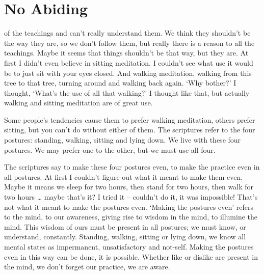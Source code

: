 
\chapter{No Abiding}

\vspace*{0.5\baselineskip}
 of the teachings and can't really understand them. We think they shouldn't be the way they are, so we don't follow them, but really there is a reason to all the teachings. Maybe it seems that things shouldn't be that way, but they are. At first I didn't even believe in sitting meditation. I couldn't see what use it would be to just sit with your eyes closed. And walking meditation, walking from this tree to that tree, turning around and walking back again. `Why bother?' I thought, `What's the use of all that walking?' I thought like that, but actually walking and sitting meditation are of great use. 

Some people's tendencies cause them to prefer walking meditation, others prefer sitting, but you can't do without either of them. The scriptures refer to the four postures: standing, walking, sitting and lying down. We live with these four postures. We may prefer one to the other, but we must use all four. 

The scriptures say to make these four postures even, to make the practice even in all postures. At first I couldn't figure out what it meant to make them even. Maybe it means we sleep for two hours, then stand for two hours, then walk for two hours \ldots{} maybe that's it? I tried it -- couldn't do it, it was impossible! That's not what it meant to make the postures even. `Making the postures even' refers to the mind, to our awareness, giving rise to wisdom in the mind, to illumine the mind. This wisdom of ours must be present in all postures; we must know, or understand, constantly. Standing, walking, sitting or lying down, we know all mental states as impermanent, unsatisfactory and not-self. Making the postures even in this way can be done, it is possible. Whether like or dislike are present in the mind, we don't forget our practice, we are aware. 

